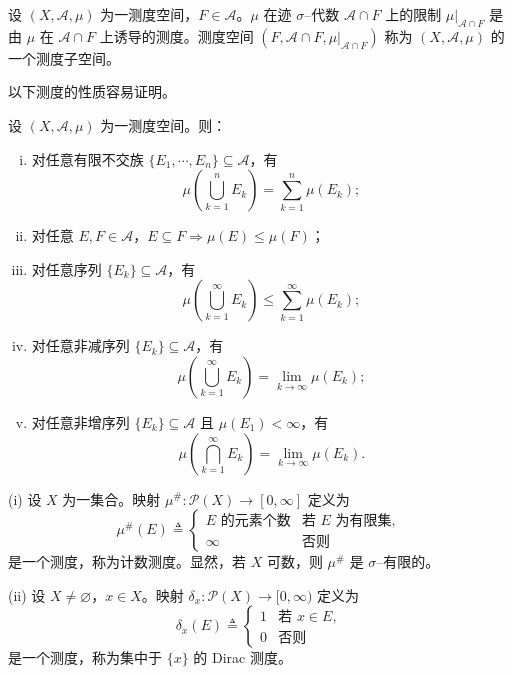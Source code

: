 \documentclass[../../main.tex]{subfiles}%
\begin{document}
\begin{remark}\label{remark:ch01-测度子空间}
设 $(X,\mathcal{A},\mu)$ 为一测度空间，$F\in\mathcal{A}$。$\mu$ 在迹 $\sigma$--代数 $\mathcal{A}\cap F$ 上的限制 $\mu|_{\mathcal{A}\cap F}$ 是由 $\mu$ 在 $\mathcal{A}\cap F$ 上诱导的测度。测度空间 $(F,\mathcal{A}\cap F,\mu|_{\mathcal{A}\cap F})$ 称为 $(X,\mathcal{A},\mu)$ 的一个测度子空间。
\end{remark}

以下测度的性质容易证明。

\begin{proposition}\label{proposition:ch01-测度性质}
设 $(X,\mathcal{A},\mu)$ 为一测度空间。则：
\begin{enumerate}[(i)]
\item 对任意有限不交族 $\{E_1,\cdots ,E_n\}\subseteq\mathcal{A}$，有
\[
\mu\left(\bigcup_{k=1}^n E_k\right)=\sum_{k=1}^n\mu(E_k);
\]
\item 对任意 $E,F\in\mathcal{A}$，$E\subseteq F\Rightarrow\mu(E)\leqslant\mu(F)$；
\item 对任意序列 $\{E_k\}\subseteq\mathcal{A}$，有
\[
\mu\left(\bigcup_{k=1}^\infty E_k\right)\leqslant\sum_{k=1}^\infty\mu(E_k);
\]
\item 对任意非减序列 $\{E_k\}\subseteq\mathcal{A}$，有
\[
\mu\left(\bigcup_{k=1}^\infty E_k\right)=\lim_{k\to\infty}\mu(E_k);
\]
\item 对任意非增序列 $\{E_k\}\subseteq\mathcal{A}$ 且 $\mu(E_1)<\infty$，有
\[
\mu\left(\bigcap_{k=1}^\infty E_k\right)=\lim_{k\to\infty}\mu(E_k).
\]
\end{enumerate}
\end{proposition}

\begin{example}\label{example:ch01-计数与Dirac}
(i) 设 $X$ 为一集合。映射 $\mu^\#:\mathcal{P}(X)\to[0,\infty]$ 定义为
\[
\mu^\#(E)\triangleq 
\begin{cases}
E\text{ 的元素个数} & \text{若 }E\text{ 为有限集},\\
\infty & \text{否则}
\end{cases}
\]
是一个测度，称为计数测度。显然，若 $X$ 可数，则 $\mu^\#$ 是 $\sigma$--有限的。

(ii) 设 $X\neq\varnothing $，$x\in X$。映射 $\delta_x:\mathcal{P}(X)\to[0,\infty)$ 定义为
\[
\delta_x(E)\triangleq 
\begin{cases}
1 & \text{若 }x\in E,\\
0 & \text{否则}
\end{cases}
\]
是一个测度，称为集中于 $\{x\}$ 的 Dirac 测度。
\end{example}
\end{document}
